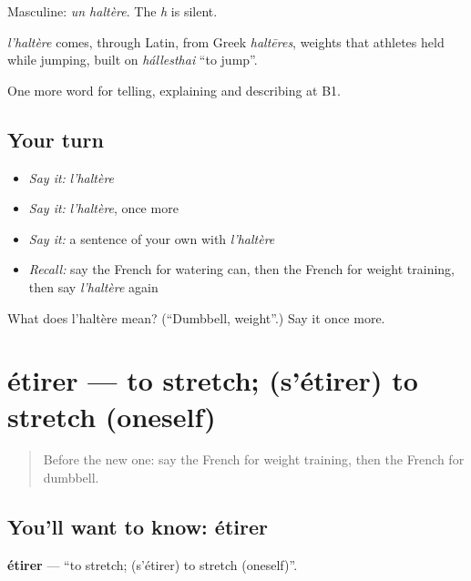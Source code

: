 Masculine: \emph{un haltère}. The \emph{h} is silent.

\begin{cousinweb}
\emph{l'haltère} comes, through Latin, from Greek \emph{haltēres}, weights that athletes held while jumping, built on \emph{hállesthai} \textquotedblleft{}to jump\textquotedblright{}.
\end{cousinweb}

\begin{grammarlens}[title={What you've built}]
One more word for telling, explaining and describing at B1.
\end{grammarlens}

\subsection*{Your turn}
\begin{itemize}
\raggedright
  \item \emph{Say it:} \emph{l'haltère}
  \item \emph{Say it:} \emph{l'haltère}, once more
  \item \emph{Say it:} a sentence of your own with \emph{l'haltère}
  \item \emph{Recall:} say the French for watering can, then the French for weight training, then say \emph{l'haltère} again
\end{itemize}

\begin{tcolorbox}[breakable,colback=teal!4,colframe=teal!35!black,title={Before you move on}]
What does l'haltère mean? (\textquotedblleft{}Dumbbell, weight\textquotedblright{}.) Say it once more.
\end{tcolorbox}
\section[étirer]{étirer — to stretch; (s'étirer) to stretch (oneself)}

\label{lesson:FR-C504-etirer}



\begin{quote}
Before the new one: say the French for weight training, then the French for dumbbell.
\end{quote}

\subsection*{You'll want to know: étirer}
\textbf{étirer} — \textquotedblleft{}to stretch; (s'étirer) to stretch (oneself)\textquotedblright{}.

